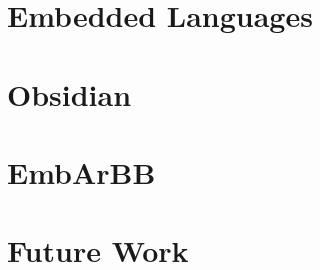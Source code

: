 \documentclass[xcolor=dvipsnames]{beamer}
\begin{document}
%
\section{Embedded Languages}

%
\section{Obsidian}

%
\section{EmbArBB} 

%
\section{Future Work}
\end{document}
